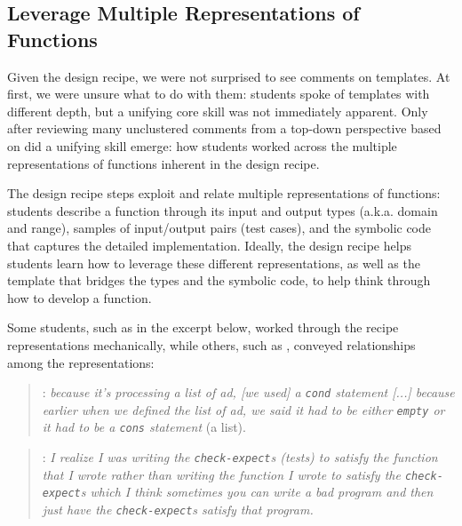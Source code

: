 \subsection*{Leverage Multiple Representations of Functions}

Given the design recipe, we were not surprised to see
comments on \htdp templates.  At first, we were unsure what to do
with them: students spoke of templates with different depth,
but a unifying core skill was not immediately apparent.  Only after
reviewing many unclustered comments from a top-down perspective based
on \htdp did a unifying skill emerge: how students worked across the
multiple representations of functions inherent in the design recipe.

The design recipe steps exploit and relate multiple representations of
functions: students describe a function through its input and output
types (a.k.a. domain and range), samples of input/output pairs (test cases), and
the symbolic code that captures the detailed implementation.  Ideally,
the design recipe helps students learn how to leverage these different
representations, as well as the template that bridges the types and
the symbolic code, to help think through how to develop a
function.

Some students, such as \ssix in the excerpt below, worked through the recipe
representations mechanically, while others, such as \stwelve, conveyed
relationships among the representations:

\begin{quote}
\ssix: \textit{because it's processing a list of ad, [we used] a \lstinline{cond} statement [...] because earlier when we defined the list of ad, we said it had to be either \lstinline{empty} or it had to be a \lstinline{cons} statement} (a list).
\end{quote}

\begin{quote}
\stwelve: \textit{I realize I was writing the \lstinline{check-expect}s (tests) to satisfy the function that I wrote rather than writing the function I wrote to satisfy the \lstinline{check-expect}s which I think sometimes you can write a bad program and then just have the \lstinline{check-expect}s satisfy that program.}
\end{quote}


